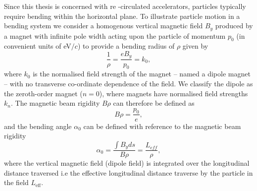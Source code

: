 \documentclass[../main.tex]{subfiles}
\begin{document}
Since this thesis is concerned with re -circulated accelerators, particles typically require bending within the horizontal plane. To illustrate particle motion in a bending system we consider a homogenous vertical magnetic field $B_{y}$ produced by a magnet with infinite pole width acting upon the particle of momentum $p_{0}$ (in convenient units of \si{\electronvolt}$/c$) to provide a bending radius of $\rho$ given by
\begin{equation}
\frac{1}{\rho} = \frac{eB_{y}}{p_{0}} = k_{0},
\label{magnet_bending_radius}    
\end{equation}
where $k_{0}$ is the normalised field strength of the magnet -- named a dipole magnet -- with no transverse co-ordinate dependence of the field. We classify the dipole as the zeroth-order magnet ($n=0$), where magnets have normalised field strengths $k_{n}$. The magnetic beam rigidity $B\rho$ can therefore be defined as
\begin{equation}
B\rho = \frac{p_{0}}{e},
\label{eq:magnetic_beam_rigidity}    
\end{equation}
and the bending angle $\alpha_{0}$ can be defined with reference to the magnetic beam rigidity
\begin{equation}
\alpha_{0} = \frac{\int B_{y} ds}{B\rho} = \frac{L_{eff}}{\rho}, 
\label{eq:dipole_bending_angle}    
\end{equation}
where the vertical magnetic field (dipole field) is integrated over the longitudinal distance traversed i.e the effective longitudinal distance traverse by the particle in the field $L_{\mathrm{eff}}$.
\end{document}
